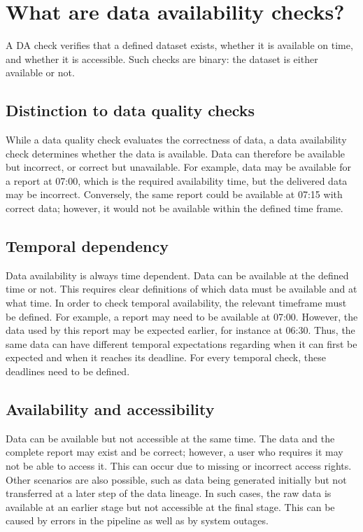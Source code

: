 \section{What are data availability checks?}
\label{ResearchWhatIsDA}
A \gls{DA} check verifies that a defined dataset exists, whether it is available on time, and whether it is accessible. Such checks are binary: the dataset is either available or not.

\subsection*{Distinction to data quality checks}
While a data quality check evaluates the correctness of data, a data availability check determines whether the data is available. Data can therefore be available but incorrect, or correct but unavailable. For example, data may be available for a report at 07:00, which is the required availability time, but the delivered data may be incorrect. Conversely, the same report could be available at 07:15 with correct data; however, it would not be available within the defined time frame.

\subsection*{Temporal dependency}
Data availability is always time dependent. Data can be available at the defined time or not. This requires clear definitions of which data must be available and at what time. In order to check temporal availability, the relevant timeframe must be defined. For example, a report may need to be available at 07:00. However, the data used by this report may be expected earlier, for instance at 06:30. Thus, the same data can have different temporal expectations regarding when it can first be expected and when it reaches its deadline. For every temporal check, these deadlines need to be defined.

\subsection*{Availability and accessibility}
Data can be available but not accessible at the same time. The data and the complete report may exist and be correct; however, a user who requires it may not be able to access it. This can occur due to missing or incorrect access rights. Other scenarios are also possible, such as data being generated initially but not transferred at a later step of the data lineage. In such cases, the raw data is available at an earlier stage but not accessible at the final stage. This can be caused by errors in the pipeline as well as by system outages.

